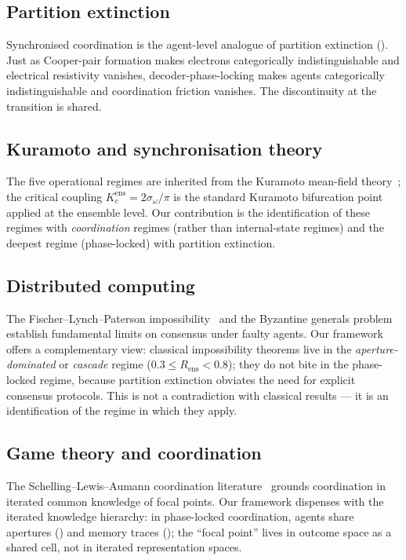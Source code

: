 \documentclass[11pt,twocolumn,a4paper]{article}
\newcommand{\Kc}{K_c}
\newcommand{\Ord}{R}
\begin{document}
\subsection{Partition extinction}
Synchronised coordination is the agent-level analogue of partition
extinction (). Just as Cooper-pair formation
makes electrons categorically indistinguishable and electrical
resistivity vanishes, decoder-phase-locking makes agents
categorically indistinguishable and coordination friction vanishes.
The discontinuity at the transition is shared.

\subsection{Kuramoto and synchronisation theory}
The five operational regimes are inherited from the Kuramoto
mean-field theory~\cite{kuramoto1975,strogatz2000,acebron2005,
pikovsky2001}; the critical coupling $\Kc^{\mathrm{ens}}=2\sigma_\omega/\pi$
is the standard Kuramoto bifurcation point applied at the ensemble
level. Our contribution is the identification of these regimes with
\emph{coordination} regimes (rather than internal-state regimes) and
the deepest regime (phase-locked) with partition extinction.

\subsection{Distributed computing}
The Fischer--Lynch--Paterson impossibility~\cite{fischer1985} and the
Byzantine generals problem~\cite{lamport1982} establish fundamental
limits on consensus under faulty agents. Our framework offers a
complementary view: classical impossibility theorems live in the
\emph{aperture-dominated} or \emph{cascade} regime
($0.3\le\Ord_{\mathrm{ens}}<0.8$); they do not bite in the
phase-locked regime, because partition extinction obviates the need
for explicit consensus protocols. This is not a contradiction with
classical results --- it is an identification of the regime in which
they apply.

\subsection{Game theory and coordination}
The Schelling--Lewis--Aumann coordination
literature~\cite{schelling1960,lewis1969,aumann1976,nash1951,
vonneumannmorgenstern1944,harsanyi1977,arrow1951} grounds coordination
in iterated common knowledge of focal points. Our framework dispenses
with the iterated knowledge hierarchy: in phase-locked coordination,
agents share apertures () and memory traces
(); the ``focal point'' lives in outcome space
as a shared cell, not in iterated representation spaces.
\end{document}
